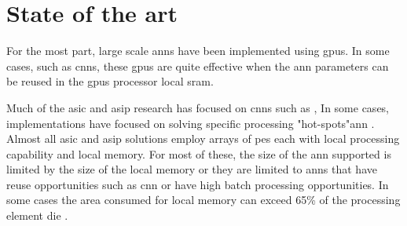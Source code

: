 
\chapter{State of the art}
\label{sec:State of the art}

For the most part, large scale \acp{ann} have been implemented using \acp{gpu}.
In some cases, such as \acp{cnn}, these \acp{gpu} are quite effective when the \ac{ann} parameters can be reused in the \acp{gpu} processor local \ac{sram}.

Much of the \ac{asic} and \ac{asip} research has focused on \acp{cnn} such as \cite{chen201614}\cite{farabet2011neuflow}, 
In some cases, implementations have focused on solving specific processing "hot-spots"\ac{ann} \cite{chen201614}.
Almost all \ac{asic} and \ac{asip} solutions employ arrays of \acp{pe} each with local processing capability and local memory.
For most of these, the size of the \ac{ann} supported is limited by the size of the local memory or they are limited to \acp{ann} that have reuse opportunities such as \ac{cnn} or have high batch processing opportunities.
In some cases \iffalse, as seen in \fref{fig:Example state-of-the-art die}\fi the area consumed for local memory can exceed 65\% of the 
processing element die \cite{kim2016neurocube}\cite{chen2014diannao}.

